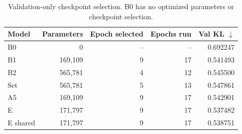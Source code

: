 \begin{table}[!htbp]
\centering
\small
\setlength{\tabcolsep}{5pt}
\begin{tabular}{lrrrr}
\toprule
Model & Parameters & Epoch selected & Epochs run & Val KL $\downarrow$ \\
\midrule
B0 & 0 & -- & -- & 0.692247 \\
B1 & 169,109 & 9 & 17 & 0.541493 \\
B2 & 565,781 & 4 & 12 & 0.545500 \\
Set & 565,781 & 5 & 13 & 0.547861 \\
A5 & 169,109 & 9 & 17 & 0.542901 \\
E & 171,797 & 9 & 17 & 0.537482 \\
E shared & 171,797 & 9 & 17 & 0.538751 \\
\bottomrule
\end{tabular}
\caption{Validation-only checkpoint selection. B0 has no optimized parameters or checkpoint selection.}
\label{tab:selection}
\end{table}

